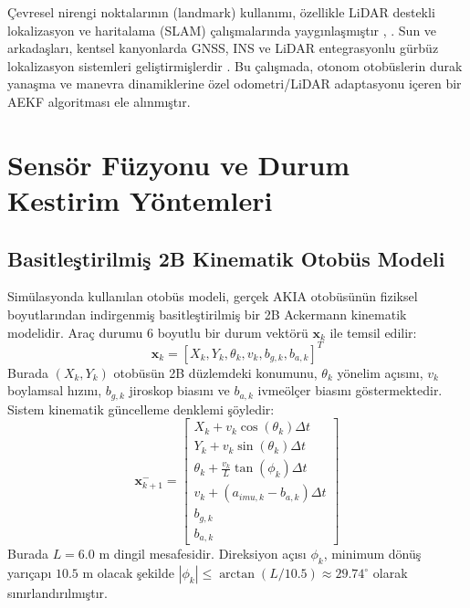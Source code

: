 ﻿\documentclass[conference]{IEEEtran}
\begin{document}
Çevresel nirengi noktalarının (landmark) kullanımı, özellikle LiDAR destekli lokalizasyon ve haritalama (SLAM) çalışmalarında yaygınlaşmıştır \cite{bresson2017localization}, \cite{eustice2006exactly}. Sun ve arkadaşları, kentsel kanyonlarda GNSS, INS ve LiDAR entegrasyonlu gürbüz lokalizasyon sistemleri geliştirmişlerdir \cite{sun2021robust}. Bu çalışmada, otonom otobüslerin durak yanaşma ve manevra dinamiklerine özel odometri/LiDAR adaptasyonu içeren bir AEKF algoritması ele alınmıştır.

\section{Sensör Füzyonu ve Durum Kestirim Yöntemleri}
\subsection{Basitleştirilmiş 2B Kinematik Otobüs Modeli}
Simülasyonda kullanılan otobüs modeli, gerçek AKIA otobüsünün fiziksel boyutlarından indirgenmiş basitleştirilmiş bir 2B Ackermann kinematik modelidir. Araç durumu 6 boyutlu bir durum vektörü $\mathbf{x}_k$ ile temsil edilir:
\begin{equation}
\mathbf{x}_k = [X_k, Y_k, \theta_k, v_k, b_{g,k}, b_{a,k}]^T
\end{equation}
Burada $(X_k, Y_k)$ otobüsün 2B düzlemdeki konumunu, $\theta_k$ yönelim açısını, $v_k$ boylamsal hızını, $b_{g,k}$ jiroskop biasını ve $b_{a,k}$ ivmeölçer biasını göstermektedir.
Sistem kinematik güncelleme denklemi şöyledir:
\begin{equation}
\mathbf{x}_{k+1}^- = 
\begin{bmatrix}
X_k + v_k \cos(\theta_k) \Delta t \\
Y_k + v_k \sin(\theta_k) \Delta t \\
\theta_k + \frac{v_k}{L} \tan(\phi_k) \Delta t \\
v_k + (a_{imu,k} - b_{a,k}) \Delta t \\
b_{g,k} \\
b_{a,k}
\end{bmatrix}
\end{equation}
Burada $L = 6.0$ m dingil mesafesidir. Direksiyon açısı $\phi_k$, minimum dönüş yarıçapı $10.5$ m olacak şekilde $|\phi_k| \le \arctan(L / 10.5) \approx 29.74^\circ$ olarak sınırlandırılmıştır.
\end{document}
